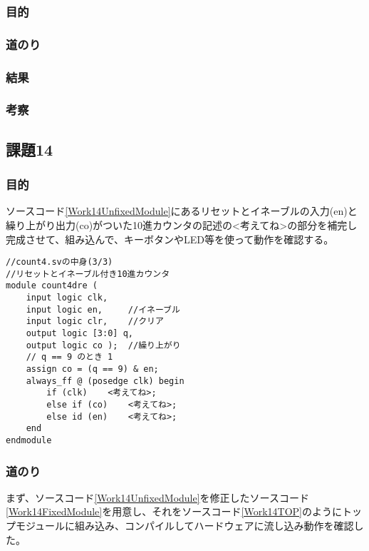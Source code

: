 \documentclass[a4paper]{jarticle}
\begin{document}
\subsubsection{目的}
\subsubsection{道のり}
\subsubsection{結果}
\subsubsection{考察}
\subsection{課題14}
\subsubsection{目的}
ソースコード\ref{Work14UnfixedModule}にあるリセットとイネーブルの入力(en)と繰り上がり出力(co)がついた10進カウンタの記述の<考えてね>の部分を補完し完成させて、組み込んで、キーボタンやLED等を使って動作を確認する。
\begin{lstlisting}[caption=count4.sv,label=Work14UnfixedModule]
//count4.svの中身(3/3)
//リセットとイネーブル付き10進カウンタ
module count4dre (
	input logic clk,
	input logic en,		//イネーブル
	input logic clr,	//クリア
	output logic [3:0] q,
	output logic co );	//繰り上がり
	// q == 9 のとき 1
	assign co = (q == 9) & en;
	always_ff @ (posedge clk) begin
		if (clk)	<考えてね>;
		else if (co)	<考えてね>;
		else id (en)	<考えてね>;
	end
endmodule
\end{lstlisting}
\subsubsection{道のり}
まず、ソースコード\ref{Work14UnfixedModule}を修正したソースコード\ref{Work14FixedModule}を用意し、それをソースコード\ref{Work14TOP}のようにトップモジュールに組み込み、コンパイルしてハードウェアに流し込み動作を確認した。


\end{document}
